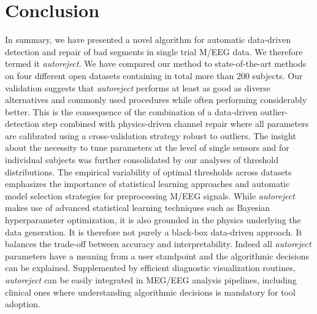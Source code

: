 \section{Conclusion}
\label{sec:autoreject_conclusion}

In summary, we have presented a novel algorithm for automatic data-driven detection and repair of bad segments in single trial M/EEG data. We therefore termed it \emph{autoreject}. We have compared our method to state-of-the-art methods on four different open datasets containing in total more than 200 subjects. Our validation suggests that \emph{autoreject} performs at least as good as diverse alternatives and commonly used procedures while often performing considerably better. This is the consequence of the combination of a data-driven outlier-detection step combined with physics-driven channel repair where all parameters are calibrated using a cross-validation strategy robust to outliers. The insight about the necessity to tune parameters at the level of single sensors and for individual subjects was further consolidated by our analyses of threshold distributions. The empirical variability of optimal thresholds across datasets emphasizes the importance of statistical learning approaches and automatic model selection strategies for preprocessing M/EEG signals. While \emph{autoreject} makes use of advanced statistical learning techniques such as Bayesian hyperparameter optimization, it is also grounded in the physics underlying the data generation. It is therefore not purely a black-box data-driven approach. It balances the trade-off between accuracy and interpretability. Indeed all \emph{autoreject} parameters have a meaning from a user standpoint and the algorithmic decisions can be explained. Supplemented by efficient diagnostic visualization routines, \emph{autoreject} can be easily integrated in MEG/EEG analysis pipelines,
including clinical ones where understanding algorithmic decisions is mandatory for tool adoption.

